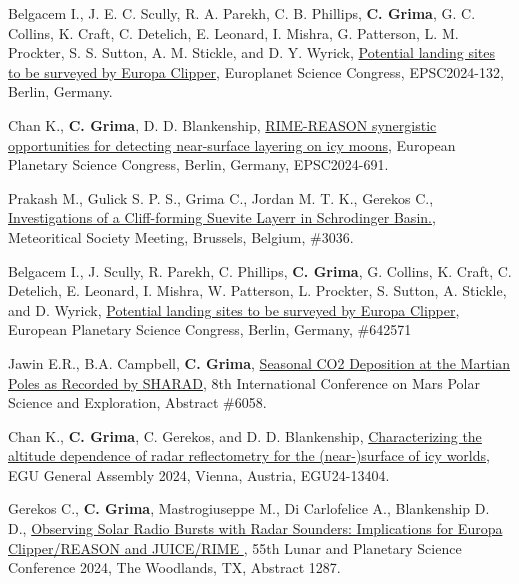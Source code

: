\begin{etaremune}
\item
    Belgacem I., J. E. C. Scully, R. A. Parekh, C. B. Phillips, \textbf{C. Grima}, G. C. Collins, K. Craft, C. Detelich, E. Leonard, I. Mishra, G. Patterson, L. M. Prockter, S. S. Sutton, A. M. Stickle, and D. Y. Wyrick,   \href{https://meetingorganizer.copernicus.org/EPSC2024/EPSC2024-132.html}{Potential landing sites to be surveyed by Europa Clipper}, Europlanet Science Congress, EPSC2024-132, Berlin, Germany.

\item 
    Chan K., \textbf{C. Grima}, D. D. Blankenship, \href{}{RIME-REASON synergistic opportunities for detecting near-surface layering on icy moons}, European Planetary Science Congress, Berlin, Germany, EPSC2024-691.
    
\item 
    Prakash M., Gulick S. P. S., Grima C., Jordan M. T. K., Gerekos C., \href{https://www.hou.usra.edu/meetings/metsoc2024/pdf/6311.pdf}{Investigations of a Cliff-forming Suevite Layerr in Schrodinger Basin.}, Meteoritical Society Meeting, Brussels, Belgium, \#3036.

\item 
    Belgacem I., J. Scully, R. Parekh, C. Phillips, \textbf{C. Grima}, G. Collins, K. Craft, C. Detelich, E. Leonard, I. Mishra, W. Patterson, L. Prockter, S. Sutton, A. Stickle, and D. Wyrick, \href{}{Potential landing sites to be surveyed by Europa Clipper}, European Planetary Science Congress, Berlin, Germany, \#642571

\item
    Jawin E.R., B.A. Campbell, \textbf{C. Grima}, \href{}{Seasonal CO2 Deposition at the Martian Poles as Recorded by SHARAD}, 8th International Conference on Mars Polar Science and Exploration, Abstract \#6058.

\item
     Chan K., \textbf{C. Grima}, C. Gerekos, and D. D. Blankenship, \href{https://meetingorganizer.copernicus.org/EGU24/EGU24-13404.html}{Characterizing the altitude dependence of radar reflectometry for the (near-)surface of icy worlds}, EGU General Assembly 2024, Vienna, Austria, EGU24-13404.

\item
     Gerekos C., \textbf{C. Grima}, Mastrogiuseppe M., Di Carlofelice A., Blankenship D. D., \href{https://www.hou.usra.edu/meetings/lpsc2024/pdf/1287.pdf}{Observing Solar Radio Bursts with Radar Sounders: Implications for Europa Clipper/REASON and JUICE/RIME }, 55th Lunar and Planetary Science Conference 2024, The Woodlands, TX, Abstract 1287.


\end{etaremune}
